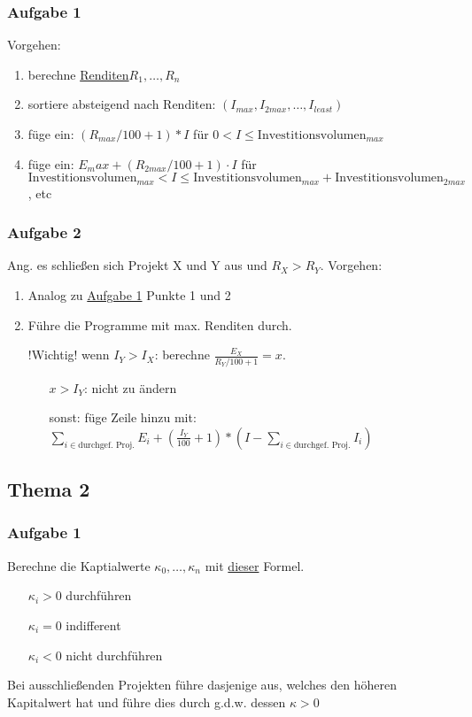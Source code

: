 \documentclass[12pt]{article}
\newcommand{\red}[1]{\color{red}#1\color{black}}
\begin{document}
		\subsubsection*{Aufgabe 1}
		\label{Thema1Aufgabe1} Vorgehen:
		\begin{enumerate}
			\setlength{\itemindent}{1cm}
			\item berechne \hyperref[Rendite]{Renditen}$R_1,\dots, R_n$
			\item sortiere absteigend nach Renditen: $(I_{max},I_{2max},\dots,I_{least})$
			\item füge ein: $(R_{max}/100+1)*I$ für $0 < I \le \text{Investitionsvolumen}_{max}$
			\item füge ein: $E_max + (R_{2max}/100+1)\cdot I$ für \\ $\text{Investitionsvolumen}_{max} < I \le \text{Investitionsvolumen}_{max}+\text{Investitionsvolumen}_{2max}$, etc 
		\end{enumerate}
		\subsubsection*{Aufgabe 2}
		Ang. es schließen sich Projekt X und Y aus und $R_X>R_Y$. Vorgehen:
		\begin{enumerate}
			\setlength{\itemindent}{1cm}
			\item Analog zu \hyperref[Thema1Aufgabe1]{Aufgabe 1} Punkte 1 und 2
			\item Führe die Programme mit max. Renditen durch.
			\item[\red{!Wichtig!}] wenn $I_Y>I_X$: berechne $\frac{E_X}{R_Y/100+1} =x$.
				\begin{itemize}
					\setlength{\itemindent}{2cm}
					\item[$x>I_Y$:] nicht zu ändern
					\item[sonst:] füge Zeile hinzu mit: ${\sum_{i\in\text{durchgef. Proj.}}E_i} + (\frac{I_Y}{100}+1)*(I-\sum_{i\in\text{durchgef. Proj.}}I_i)$
				\end{itemize}
		\end{enumerate}
	\subsection*{Thema 2}
		\subsubsection*{Aufgabe 1}\label{Thema2Aufgabe1}
		Berechne die Kaptialwerte $\kappa_0, \dots, \kappa_n$ mit \hyperref[Kapitalwert]{dieser} Formel.
		\begin{itemize}
			\setlength{\itemindent}{1cm}
			\item[$\kappa_i>0$] durchführen
			\item[$\kappa_i =0$] indifferent
			\item[$\kappa_i<0$] nicht durchführen
		\end{itemize}
		Bei ausschließenden Projekten führe dasjenige aus, welches den höheren Kapitalwert hat und führe dies durch g.d.w. dessen $\kappa>0$
\end{document}
